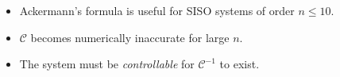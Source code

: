 \begin{itemize}
	\item Ackermann's formula is useful for SISO systems of order  $n\le 10$.
	\item $\mathcal{C}$ becomes numerically inaccurate for large $n$.
	\item The system must be \emph{controllable} for $\mathcal{C}^{-1}$ to exist.
\end{itemize}

\endinput

